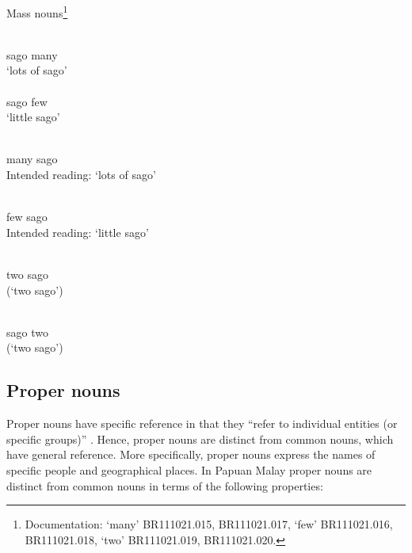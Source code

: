 \begin{styleExampleTitle}
Mass nouns\footnote{Documentation:  ‘many’ BR111021.015, BR111021.017,  ‘few’ BR111021.016, BR111021.018,  ‘two’ BR111021.019, BR111021.020.}
\end{styleExampleTitle}
 
\ea
\label{Example_5.7}
\gll {} \\
sago many\\
\glt ‘lots of sago’\\
\z 
\ea
\label{Example_5.8}
\gll {} \\ %
sago few\\
\glt ‘little sago’\\
\z
 
\ea
\label{Example_5.9}
\gll {} \\ %
many sago\\
\glt Intended reading: ‘lots of sago’\\
\z
 
\ea
\label{Example_5.10}
\gll {} \\ %
few sago\\
\glt Intended reading: ‘little sago’\\
\z
 
\ea
\label{Example_5.11}
\gll {} \\ %
two sago\\
\glt (‘two sago’)\\
\z
 
\ea
\label{Example_5.12}
\gll {} \\ %
sago two\\
\glt (‘two sago’)\\
\z
 

\subsection{Proper nouns}
\label{Para_5.2.2}
Proper nouns have specific reference in that they “refer to individual entities (or specific groups)” \citep[58]{Givon.2001}. Hence, proper nouns are distinct from common nouns, which have general reference. More specifically, proper nouns express the names of specific people and geographical places. In Papuan Malay proper nouns are distinct from common nouns in terms of the following properties:




